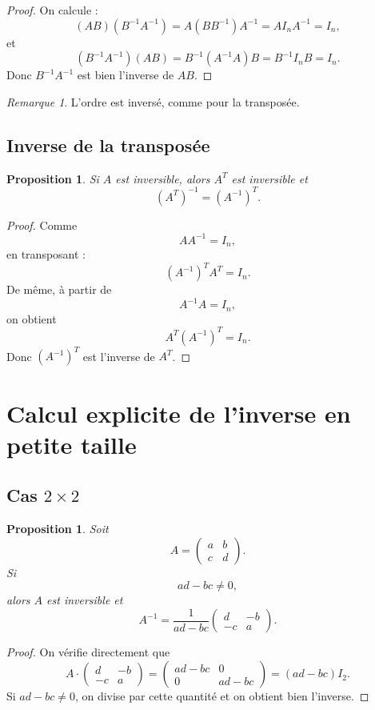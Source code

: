 \documentclass[11pt,a4paper]{article}
\newtheorem{proposition}[definition]{Proposition}
\theoremstyle{remark}
\newtheorem{remarque}[definition]{Remarque}
\begin{document}
\begin{proof}
On calcule :
\[
(AB)(B^{-1}A^{-1})=A(BB^{-1})A^{-1}=AI_nA^{-1}=I_n,
\]
et
\[
(B^{-1}A^{-1})(AB)=B^{-1}(A^{-1}A)B=B^{-1}I_nB=I_n.
\]
Donc \(B^{-1}A^{-1}\) est bien l’inverse de \(AB\).
\end{proof}

\begin{remarque}
L’ordre est inversé, comme pour la transposée.
\end{remarque}

\subsection{Inverse de la transposée}

\begin{proposition}
Si \(A\) est inversible, alors \(A^T\) est inversible et
\[
(A^T)^{-1}=(A^{-1})^T.
\]
\end{proposition}

\begin{proof}
Comme
\[
AA^{-1}=I_n,
\]
en transposant :
\[
(A^{-1})^TA^T=I_n.
\]
De même, à partir de
\[
A^{-1}A=I_n,
\]
on obtient
\[
A^T(A^{-1})^T=I_n.
\]
Donc \((A^{-1})^T\) est l’inverse de \(A^T\).
\end{proof}

\section{Calcul explicite de l’inverse en petite taille}

\subsection{Cas \(2\times 2\)}

\begin{proposition}
Soit
\[
A=
\begin{pmatrix}
a & b\\
c & d
\end{pmatrix}.
\]
Si
\[
ad-bc\neq 0,
\]
alors \(A\) est inversible et
\[
A^{-1}=\frac{1}{ad-bc}
\begin{pmatrix}
d & -b\\
-c & a
\end{pmatrix}.
\]
\end{proposition}

\begin{proof}
On vérifie directement que
\[
A\cdot
\begin{pmatrix}
d & -b\\
-c & a
\end{pmatrix}
=
\begin{pmatrix}
ad-bc & 0\\
0 & ad-bc
\end{pmatrix}
=(ad-bc)I_2.
\]
Si \(ad-bc\neq 0\), on divise par cette quantité et on obtient bien l’inverse.
\end{proof}
\end{document}
